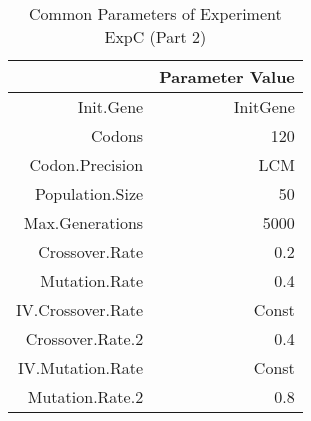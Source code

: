 \begin{table}[ht]
\centering
\begin{tabular}{rr}
  \hline
 & Parameter Value \\ 
  \hline
Init.Gene & InitGene \\ 
  Codons & 120 \\ 
  Codon.Precision & LCM \\ 
  Population.Size & 50 \\ 
  Max.Generations & 5000 \\ 
  Crossover.Rate & 0.2 \\ 
  Mutation.Rate & 0.4 \\ 
  IV.Crossover.Rate & Const \\ 
  Crossover.Rate.2 & 0.4 \\ 
  IV.Mutation.Rate & Const \\ 
  Mutation.Rate.2 & 0.8 \\ 
   \hline
\end{tabular}
\caption{Common Parameters of Experiment ExpC (Part 2)} 
\end{table}
